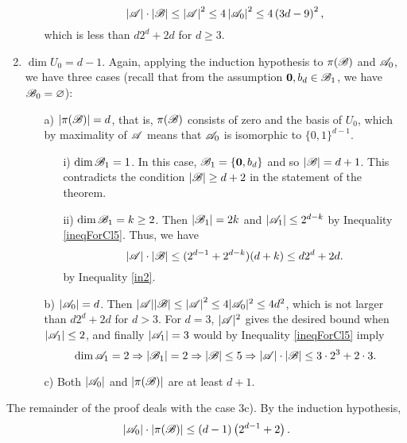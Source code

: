 \begin{enumerate}
\begin{enumerate}
            \begin{equation*}
                \left|{\mathscr{A}}\right|\cdot\left|{\mathscr{B}}\right| \leq \left|{\mathscr{A}}\right|^2 \leq 4\left|{\mathscr{A}}_0\right|^2 \leq 4\left(3d-9\right)^2,
            \end{equation*}
            which is less than $d2^d+2d$ for $d\geq3$. 
        \end{enumerate}
        \item $\operatorname{dim}U_0 = d-1$. Again, applying the induction hypothesis to $\pi({\mathscr{B}})$ and ${\mathscr{A}}_0$, we have three cases (recall that from the assumption $\mathbf{0},b_d\in{\mathscr{B}}_1$, we have ${\mathscr{B}}_0=\varnothing$):
        \begin{enumerate}
            \item[a)] $|\pi({\mathscr{B}})|=d$, that is, $\pi({\mathscr{B}})$ consists of zero and the basis of $U_0$, which by maximality of ${\mathscr{A}}$ means that ${\mathscr{A}}_0$ is isomorphic to $\{0,1\}^{d-1}$.
            \begin{enumerate}
                \item[i)] $\operatorname{dim}{\mathscr{B}}_1=1$. In this case, ${\mathscr{B}}_1=\{\mathbf{0}, b_d\}$ and so $\left|{\mathscr{B}}\right|=d+1$. This contradicts the condition $|{\mathscr{B}}|\ge d+2$ in the statement of the theorem.
                \item[ii)] $\operatorname{dim}{\mathscr{B}}_1=k\geq2$. Then $\left|{\mathscr{B}}_1\right|=2k$ and $\left|{\mathscr{A}}_1\right|\leq2^{d-k}$ by Inequality \ref{ineqForCl5}. Thus, we have
                \begin{equation*}
                    \left|{\mathscr{A}}\right|\cdot\left|{\mathscr{B}}\right|\leq(2^{d-1}+2^{d-k})(d+k) \leq d2^d+2d.
                \end{equation*}
                by Inequality \ref{in2}.
            \end{enumerate}
            \item[b)] $\left|{\mathscr{A}}_0\right|=d$. Then $|{\mathscr{A}}||{\mathscr{B}}|\leq\left|{\mathscr{A}}\right|^2\leq4|{\mathscr{A}}_0|^2\leq4d^2$, which is not larger than $d2^d+2d$ for $d>3$. For $d=3$, $|{\mathscr{A}}|^2$ gives the desired bound when $|{\mathscr{A}}_1|\leq2$, and finally $|{\mathscr{A}}_1|=3$ would by Inequality \ref{ineqForCl5} imply 
            \[
                \operatorname{dim}{\mathscr{A}}_1=2 \Rightarrow |{\mathscr{B}}_1|=2 \Rightarrow |{\mathscr{B}}|\leq 5 \Rightarrow |{\mathscr{A}}|\cdot|{\mathscr{B}}|\leq 3\cdot 2^3 + 2\cdot 3.
            \]
            \item[c)] Both $\left|{\mathscr{A}}_0\right|$ and $\left|\pi({\mathscr{B}})\right|$ are at least $d+1$.
        \end{enumerate}
    \end{enumerate}
    The remainder of the proof deals with the case 3c). By the induction hypothesis, \begin{equation*}
            \left|{\mathscr{A}}_0\right|\cdot\left|\pi({\mathscr{B}})\right|\leq\left(d-1\right)\left(2^{d-1}+2\right).
        \end{equation*}

